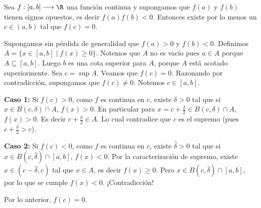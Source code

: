 
\begin{teorema} %
Sea $f:[a,b]\longrightarrow \R$ una función continua y supongamos que $f(a)$ y $f(b)$ tienen signos opuestos, es decir $f(a)f(b)<0$. %
Entonces existe por lo menos un $c \in (a,b)$ tal que $f(c)=0$. %
\end{teorema}

\begin{center}
\end{center}

\begin{dem} %
Supongamos sin pérdida de generalidad que $f(a)>0$ y $f(b)<0$. %
Definimos $A = \{x \in [a,b] \mid f(x) \ge 0\}$. %
Notemos que $A$ no es vacío pues $a \in A$ porque $A \subseteq [a,b]$. %
Luego $b$ es una cota superior para $A$, porque $A$ está acotado superiormente. %
Sea $c = \sup A$. Veamos que $f(c)=0$. %
Razonando por contradicción, supongamos que $f(c) \neq 0$. Notemos $c \in [a,b]$. %

\textbf{Caso 1:} Si $f(c)>0$, como $f$ es continua en $c$, existe $\delta>0$ tal que si $x \in B(c,\delta) \cap A$, $f(x)>0$. %
En particular para $x=c+\frac{\delta}{2} \in B(c,\delta) \cap A$, $f(x)>0$. %
Es decir $c+\frac{\delta}{2} \in A$. %
Lo cual contradice que $c$ es el supremo (pues $c+\frac{\delta}{2} > c$). %

\textbf{Caso 2:} Si $f(c)<0$, como $f$ es continua en $c$, existe $\hat{\delta}>0$ tal que si $x \in B(c,\hat{\delta}) \cap [a,b]$, $f(x)<0$. %
Por la caracterización de supremo, existe $x \in (c-\hat{\delta}, c)$ tal que $x \in A$, es decir $f(x) \ge 0$. %
Pero $x \in B(c,\hat{\delta}) \cap [a,b]$, por lo que se cumple $f(x) < 0$. ¡Contradicción! %

Por lo anterior, $f(c)=0$. %
\end{dem}

